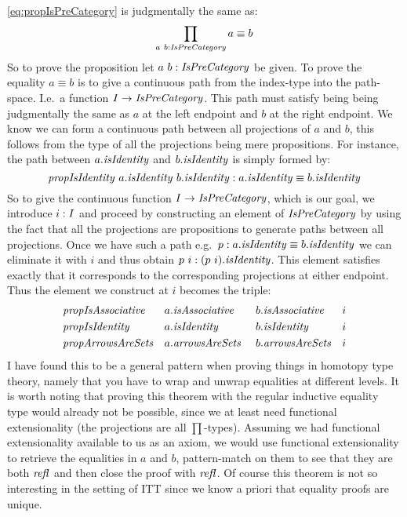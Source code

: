 \ref{eq:propIsPreCategory} is judgmentally the same as:
%
$$
\prod_{a\ b \tp \IsPreCategory} a \equiv b
$$
%
So to prove the proposition let $a\ b \tp \IsPreCategory$ be given. To
prove the equality $a \equiv b$ is to give a continuous path from the
index-type into the path-space. I.e.\ a function $I \to
\IsPreCategory$. This path must satisfy being being judgmentally the
same as $a$ at the left endpoint and $b$ at the right endpoint. We
know we can form a continuous path between all projections of $a$ and
$b$, this follows from the type of all the projections being mere
propositions. For instance, the path between $a.\isIdentity$ and
$b.\isIdentity$ is simply formed by:
%
$$
\propIsIdentity\ a.\isIdentity\ b.\isIdentity
\tp
a.\isIdentity \equiv b.\isIdentity
$$
%
So to give the continuous function $I \to \IsPreCategory$, which is our goal, we
introduce $i \mathrel{:} I$ and proceed by constructing an element of $\IsPreCategory$
by using the fact that all the projections are propositions to generate paths
between all projections. Once we have such a path e.g.\ $p \tp a.\isIdentity
\equiv b.\isIdentity$ we can eliminate it with $i$ and thus obtain $p\ i \tp
(p\ i).\isIdentity$. This element satisfies exactly that it corresponds to the
corresponding projections at either endpoint. Thus the element we construct at
$i$ becomes the triple:
%
\begin{equation}
\label{eq:proof-prop-IsPreCategory}
\begin{aligned}
  & \var{propIsAssociative} && a.\var{isAssociative}\
       && b.\var{isAssociative} && i  \\
  & \propIsIdentity    && a.\isIdentity\
       && b.\isIdentity    && i  \\
  & \var{propArrowsAreSets} && a.\var{arrowsAreSets}\
       && b.\var{arrowsAreSets} && i
\end{aligned}
\end{equation}
%
I have found this to be a general pattern when proving things in
homotopy type theory, namely that you have to wrap and unwrap
equalities at different levels. It is worth noting that proving this
theorem with the regular inductive equality type would already not be
possible, since we at least need functional
extensionality\index{functional extensionality} (the projections are
all $\prod$-types). Assuming we had functional extensionality
available to us as an axiom, we would use functional extensionality
\TODO{in reverse?} to retrieve the equalities in $a$ and $b$,
pattern-match on them to see that they are both $\refl$ and then close
the proof with $\refl$. Of course this theorem is not so interesting
in the setting of ITT since we know a priori that equality proofs are
unique.

